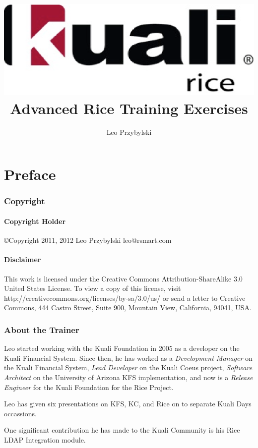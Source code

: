 \documentclass[letterpaper,notitlepage,12pt]{book}
\author{Leo Przybylski}
\title{\includegraphics[width=\textwidth]{cover.eps}\\Advanced Rice Training Exercises}
\date{}
\begin{document}
\maketitle
\tableofcontents

\part*{Preface}

\section*{Copyright}
\subsection*{Copyright Holder}
\copyright Copyright 2011, 2012
Leo Przybylski
leo@rsmart.com

\subsection*{Disclaimer}
This work is licensed under the Creative Commons Attribution-ShareAlike 3.0 United States License. To view a copy of this license, visit http://creativecommons.org/licenses/by-sa/3.0/us/ or send a letter to Creative Commons, 444 Castro Street, Suite 900, Mountain View, California, 94041, USA.

\section*{About the Trainer}
Leo started working with the Kuali Foundation in 2005 as a developer
on the Kuali Financial System. Since then, he has worked as a
\emph{Development Manager} on the Kuali Financial System, \emph{Lead Developer} on
the Kuali Coeus project, \emph{Software Architect} on the University of
Arizona KFS implementation, and now is a \emph{Release Engineer} for the
Kuali Foundation for the Rice Project. 

Leo has given six presentations on KFS, KC, and Rice on to separate
Kuali Days occassions. 

One significant contribution he has made to the Kuali Community is his
Rice LDAP Integration module.

\end{document}
